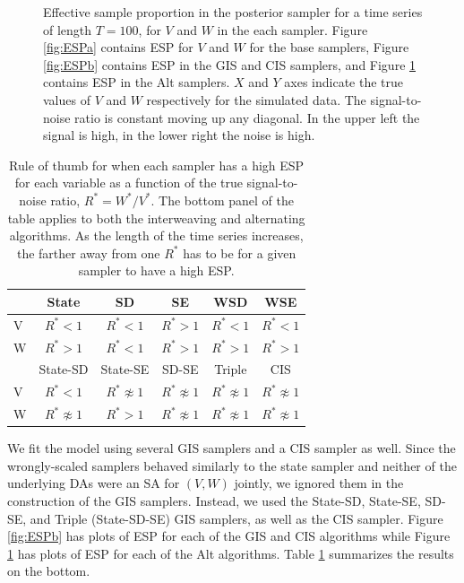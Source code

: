 \documentclass[12pt]{article}
\begin{document}
\begin{figure}[!h]
\begin{subfigure}[b]{0.45\textwidth}
\caption{}
\label{fig:ESPc}
\end{subfigure}
\caption{Effective sample proportion in the posterior sampler for a time series of length $T=100$, for $V$ and $W$ in the each sampler. Figure \ref{fig:ESPa} contains ESP for $V$ and $W$ for the base samplers, Figure \ref{fig:ESPb} contains ESP in the GIS and CIS samplers, and Figure \ref{fig:ESPc} contains ESP in the Alt samplers. $X$ and $Y$ axes indicate the true values of $V$ and $W$ respectively for the simulated data. The signal-to-noise ratio is constant moving up any diagonal. In the upper left the signal is high, in the lower right the noise is high.}
\label{ESplot}
\end{figure}

\setlength{\tabcolsep}{6pt}
\begin{table}
  \centering
  \begin{tabular}{lccccc}\hline
     & State           & SD                 & SE                  & WSD                 & WSE \\\hline
   V & $R^* < 1$       & $R^* < 1$           & $R^* > 1$           & $R^* < 1$           & $R^* < 1$ \\ 
   W & $R^* > 1$       & $R^* < 1$           & $R^* > 1$           & $R^* > 1$           & $R^* > 1$ \\ \hline
     & State-SD        & State-SE            & SD-SE              & Triple              & CIS \\\hline
   V & $R^* < 1$       & $R^* \not\approx 1$ & $R^* \not\approx 1$ & $R^* \not\approx 1$ & $R^* \not\approx 1$ \\
  W  &$R^* \not\approx 1$& $R^* > 1$          & $R^* \not\approx 1$ & $R^* \not\approx 1$ & $R^* \not\approx 1$\\\hline
  \end{tabular}
  \caption{Rule of thumb for when each sampler has a high ESP for each variable as a function of the true signal-to-noise ratio, $R^*=W^*/V^*$. The bottom panel of the table applies to both the interweaving and alternating algorithms. As the length of the time series increases, the farther away from one $R^*$ has to be for a given sampler to have a high ESP.}
  \label{tab:stnmix}
\end{table}

We fit the model using several GIS samplers and a CIS sampler as well. Since the wrongly-scaled samplers behaved similarly to the state sampler and neither of the underlying DAs were an SA for $(V,W)$ jointly, we ignored them in the construction of the GIS samplers. Instead, we used the State-SD, State-SE, SD-SE, and Triple (State-SD-SE) GIS samplers, as well as the CIS sampler. Figure \ref{fig:ESPb} has plots of ESP for each of the GIS and CIS algorithms while Figure \ref{fig:ESPc} has plots of ESP for each of the Alt algorithms. Table \ref{tab:stnmix} summarizes the results on the bottom. 
\end{document}
